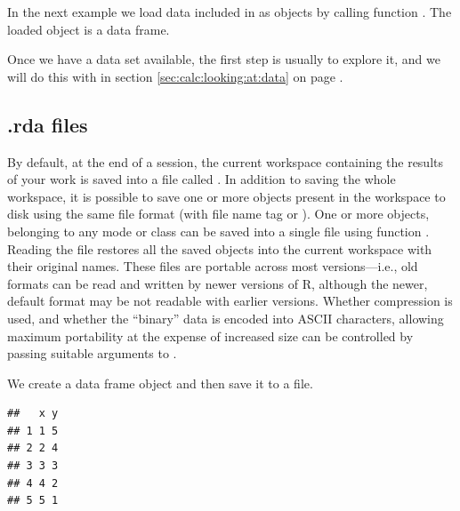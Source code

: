 \documentclass[krantz2]{krantz}\usepackage{knitr}
\begin{document}
In the next example we load data included in \Rlang as \Rlang objects by calling function . The loaded \Rlang object  is a data frame.

\begin{knitrout}\footnotesize
{}\color{fgcolor}\begin{kframe}
\begin{alltt}
\end{alltt}
\end{kframe}
\end{knitrout}

Once we have a data set available, the first step is usually to explore it, and we will do this with  in section \ref{sec:calc:looking:at:data} on page \pageref{sec:calc:looking:at:data}.

\subsection{.rda files}\label{sec:data:rda}

By default, at the end of a session, the current workspace containing the results of your work is saved into a file called . In addition to saving the whole workspace, it is possible to save one or more \Rlang objects present in the workspace to disk using the same file format (with file name tag  or ). One or more objects, belonging to any mode or class can be saved into a single file using function . Reading the file restores all the saved objects into the current workspace with their original names. These files are portable across most \Rlang versions---i.e., old formats can be read and written by newer versions of R, although the newer, default format may be not readable with earlier \Rlang versions. Whether compression is used, and whether the ``binary'' data is encoded into ASCII characters, allowing maximum portability at the expense of increased size can be controlled by passing suitable arguments to .

We create a data frame object and then save it to a file.

\begin{knitrout}\footnotesize
{}\color{fgcolor}\begin{kframe}
\begin{alltt}
 \hlkwb{<-} \hlstd{(} \hlstd{=} \hlopt{:}\hlstd{,}  \hlstd{=} \hlopt{:}\hlstd{)}
\end{alltt}
\begin{verbatim}
##   x y
## 1 1 5
## 2 2 4
## 3 3 3
## 4 4 2
## 5 5 1
\end{verbatim}
\begin{alltt}
  \hlstd{=} \hlstd{)}
\end{alltt}
\end{kframe}
\end{knitrout}
\end{document}
